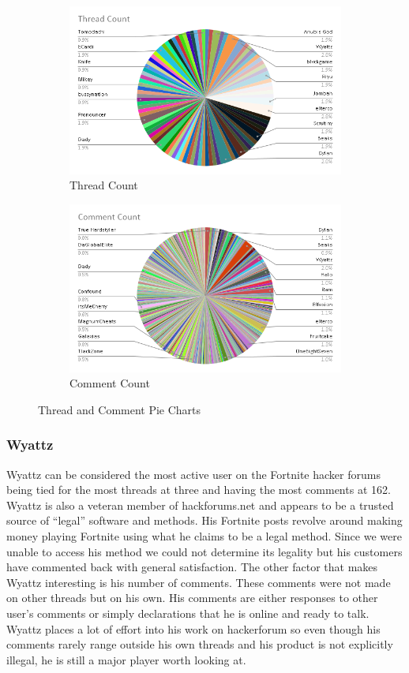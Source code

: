 \documentclass[sigconf]{acmart}
\begin{document}
\begin{figure}[h]
\centering
\begin{subfigure}{.25\textwidth}
 	\centering
	\includegraphics[width = .4\linewidth]{ThreadCount.png}
	\caption{Thread Count}
\end{subfigure}%
\begin{subfigure}{.25\textwidth}
 	\centering
	\includegraphics[width=.4\linewidth]{CommentCount.png}
	\caption{Comment Count}
\end{subfigure}
\caption{Thread and Comment Pie Charts}
\end{figure}


\subsubsection{Wyattz}
Wyattz can be considered the most active user on the Fortnite hacker forums being tied for the most threads at three and having the most comments at 162. Wyattz is also a veteran member of hackforums.net and appears to be a trusted source of “legal” software and methods. His Fortnite posts revolve around making money playing Fortnite using what he claims to be a legal method. Since we were unable to access his method we could not determine its legality but his customers have commented back with general satisfaction. The other factor that makes Wyattz interesting is his number of comments. These comments were not made on other threads but on his own. His comments are either responses to other user’s comments or simply declarations that he is online and ready to talk. Wyattz places a lot of effort into his work on hackerforum so even though his comments rarely range outside his own threads and his product is not explicitly illegal, he is still a major player worth looking at.
\end{document}
